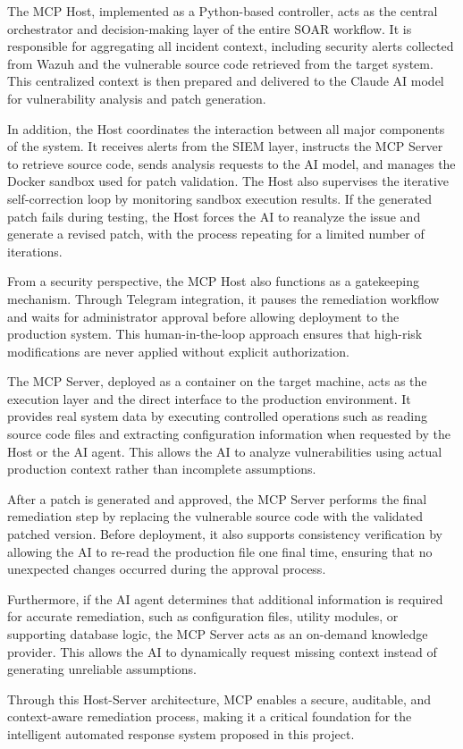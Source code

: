 \documentclass[12pt]{report}
\begin{document}
The MCP Host, implemented as a Python-based controller, acts as the central orchestrator and decision-making layer of the entire SOAR workflow. It is responsible for aggregating all incident context, including security alerts collected from Wazuh and the vulnerable source code retrieved from the target system. This centralized context is then prepared and delivered to the Claude AI model for vulnerability analysis and patch generation.

In addition, the Host coordinates the interaction between all major components of the system. It receives alerts from the SIEM layer, instructs the MCP Server to retrieve source code, sends analysis requests to the AI model, and manages the Docker sandbox used for patch validation. The Host also supervises the iterative self-correction loop by monitoring sandbox execution results. If the generated patch fails during testing, the Host forces the AI to reanalyze the issue and generate a revised patch, with the process repeating for a limited number of iterations.

From a security perspective, the MCP Host also functions as a gatekeeping mechanism. Through Telegram integration, it pauses the remediation workflow and waits for administrator approval before allowing deployment to the production system. This human-in-the-loop approach ensures that high-risk modifications are never applied without explicit authorization.

The MCP Server, deployed as a container on the target machine, acts as the execution layer and the direct interface to the production environment. It provides real system data by executing controlled operations such as reading source code files and extracting configuration information when requested by the Host or the AI agent. This allows the AI to analyze vulnerabilities using actual production context rather than incomplete assumptions.

After a patch is generated and approved, the MCP Server performs the final remediation step by replacing the vulnerable source code with the validated patched version. Before deployment, it also supports consistency verification by allowing the AI to re-read the production file one final time, ensuring that no unexpected changes occurred during the approval process.

Furthermore, if the AI agent determines that additional information is required for accurate remediation, such as configuration files, utility modules, or supporting database logic, the MCP Server acts as an on-demand knowledge provider. This allows the AI to dynamically request missing context instead of generating unreliable assumptions.

Through this Host-Server architecture, MCP enables a secure, auditable, and context-aware remediation process, making it a critical foundation for the intelligent automated response system proposed in this project.
\end{document}
